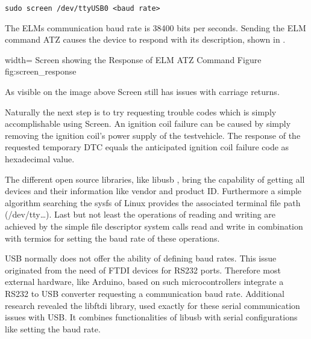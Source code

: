 \begin{verbatim}
sudo screen /dev/ttyUSB0 <baud rate> 
\end{verbatim}

The ELMs communication baud rate is 38400 bits per seconds. Sending the ELM command ATZ causes the device to respond with its description, shown in .

 {width=\textwidth}%
 {Screen showing the Response of ELM ATZ Command}%
 {Figure}%
 {fig:screen_response}%

As visible on the image above Screen still has issues with carriage returns.

Naturally the next step is to try requesting trouble codes which is simply accomplishable using Screen. An ignition coil failure can be
caused by simply removing the ignition coil's power supply of the testvehicle. The response of the requested temporary DTC equals the anticipated 
ignition coil failure code as hexadecimal value. 


The different open source libraries, like libusb \cite{LIBUSB}, bring the capability of getting all devices and their information like vendor and product ID.
Furthermore a simple algorithm searching the sysfs of Linux provides the associated terminal file path (/dev/tty…). Last but not least the 
operations of reading and writing are achieved by the simple file descriptor system calls read and write in combination with termios for 
setting the baud rate of these operations. 

USB normally does not offer the ability of defining baud rates. This issue originated from the need of FTDI devices for RS232 ports. Therefore most
external hardware, like Arduino, based on such microcontrollers integrate a RS232 to USB converter requesting a communication baud rate. Additional 
research revealed the libftdi library, used exactly for these serial communication issues with USB. It combines functionalities of libusb with serial
configurations like setting the baud rate. 

